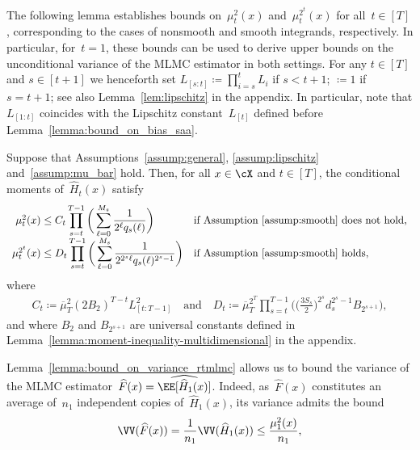 \documentclass[11pt]{article}
\let\hat\widehat
\begin{document}
The following lemma establishes bounds on~$\mu_t^2(x)$ and~$\mu_t^{2^t}(x)$ for all~$t \in [T]$, corresponding to the cases of nonsmooth and smooth integrands, respectively. In particular, for~$t = 1$, these bounds can be used to derive upper bounds on the unconditional variance of the MLMC estimator in both settings. For any $t\in[T]$ and $s\in[t+1]$ we henceforth set $L_{[s:t]}\coloneqq\prod_{i=s}^t L_i$ if $s<t+1$; $\coloneqq1$ if $s=t+1$; see also Lemma~\ref{lem:lipschitz} in the appendix. In particular, note that $L_{[1:t]}$ coincides with the Lipschitz constant~$L_{[t]}$ defined before Lemma~\ref{lemma:bound_on_bias_saa}.


\begin{lemma}
\label{lemma:bound_on_variance_rtmlmc}
Suppose that Assumptions~\ref{assump:general}, \ref{assump:lipschitz} and~\ref{assump:mu_bar} hold. Then, for all $x \in \cX$ and $t \in [T]$, the conditional moments of~$\hat{H}_t(x)$ satisfy
\begin{align*}
    \begin{array}{r@{\;}ll}
    \mu_t^2(x)& \displaystyle \leq 
         C_t \displaystyle\prod_{s=t}^{T-1} \bigg(\displaystyle\sum_{\ell=0}^{M_s}\frac{1}{2^{\ell} q_s(\ell)} \bigg) & \text{if Assumption~\ref{assump:smooth} does not hold,}\\
    \mu_t^{2^t}(x) & \displaystyle \leq 
        D_t\displaystyle\prod_{s=t}^{T-1}           \bigg(\displaystyle\sum_{\ell=0}^{M_s}\frac{1}{2^{2^s \ell} q_s(\ell)^{2^{s}-1}} \bigg)& \text{if Assumption~\ref{assump:smooth} holds,}
        \end{array}
\end{align*}
where
\begin{align*}
    C_t\coloneqq \overline\mu_T^2 (2B_2)^{T-t}L_{[t:T-1]}^2\quad\text{and}\quad
    D_t\coloneqq\overline\mu_T^{2^T} \prod_{s=t}^{T-1} \bigg(\bigg(\frac{3S_s}{2}\bigg)^{2^s} d_s^{2^s-1} B_{2^{s+1}}\bigg),
\end{align*}
and where $B_2$ and $B_{2^{s+1}}$ are universal constants defined in Lemma~\ref{lemma:moment-inequality-multidimensional} in the appendix.
\end{lemma}
Lemma~\ref{lemma:bound_on_variance_rtmlmc} allows us to bound the variance of the MLMC estimator~$\hat F(x)=\hat\EE[\hat H_1(x)]$. Indeed, as~$\hat F(x)$ constitutes an average of~$n_1$ independent copies of~$\hat H_1(x)$, its variance admits the bound
\begin{equation}
    \label{eq:variance-rtmlmc-estimator}
    \VV(\hat F(x)) = \frac{1}{n_1} \VV(\hat H_1(x)) \leq \frac{\mu_1^2(x)}{n_1},
\end{equation}
\end{document}
